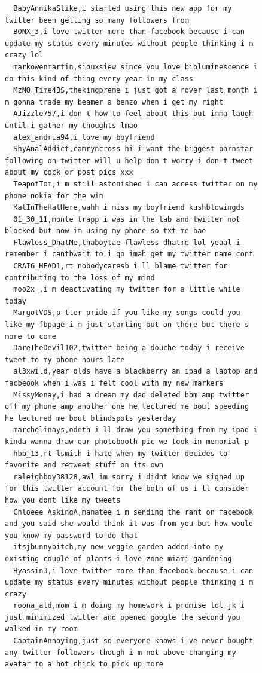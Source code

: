 \begin{figure}[htpb]
\begin{verbatim}
  BabyAnnikaStike,i started using this new app for my twitter been getting so many followers from
  BONX_3,i love twitter more than facebook because i can update my status every minutes without people thinking i m crazy lol
  markowenmartin,siouxsiew since you love bioluminescence i do this kind of thing every year in my class
  MzNO_Time4BS,thekingpreme i just got a rover last month i m gonna trade my beamer a benzo when i get my right
  AJizzle757,i don t how to feel about this but imma laugh until i gather my thoughts lmao
  alex_andria94,i love my boyfriend
  ShyAnalAddict,camryncross hi i want the biggest pornstar following on twitter will u help don t worry i don t tweet about my cock or post pics xxx
  TeapotTom,i m still astonished i can access twitter on my phone nokia for the win
  KatInTheHatHere,wahh i miss my boyfriend kushblowingds
  01_30_11,monte trapp i was in the lab and twitter not blocked but now im using my phone so txt me bae
  Flawless_DhatMe,thaboytae flawless dhatme lol yeaal i remember i cantbwait to i go imah get my twitter name cont
  CRAIG_HEAD1,rt nobodycaresb i ll blame twitter for contributing to the loss of my mind
  moo2x_,i m deactivating my twitter for a little while today
  MargotVDS,p tter pride if you like my songs could you like my fbpage i m just starting out on there but there s more to come
  DareTheDevil102,twitter being a douche today i receive tweet to my phone hours late
  al3xwild,year olds have a blackberry an ipad a laptop and facbeook when i was i felt cool with my new markers
  MissyMonay,i had a dream my dad deleted bbm amp twitter off my phone amp another one he lectured me bout speeding he lectured me bout blindspots yesterday
  marchelinays,odeth i ll draw you something from my ipad i kinda wanna draw our photobooth pic we took in memorial p
  hbb_13,rt lsmith i hate when my twitter decides to favorite and retweet stuff on its own
  raleighboy38128,awl im sorry i didnt know we signed up for this twitter account for the both of us i ll consider how you dont like my tweets
  Chloeee_AskingA,manatee i m sending the rant on facebook and you said she would think it was from you but how would you know my password to do that
  itsjbunnybitch,my new veggie garden added into my existing couple of plants i love zone miami gardening
  Hyassin3,i love twitter more than facebook because i can update my status every minutes without people thinking i m crazy
  roona_ald,mom i m doing my homework i promise lol jk i just minimized twitter and opened google the second you walked in my room
  CaptainAnnoying,just so everyone knows i ve never bought any twitter followers though i m not above changing my avatar to a hot chick to pick up more

\end{verbatim}
\end{figure}
